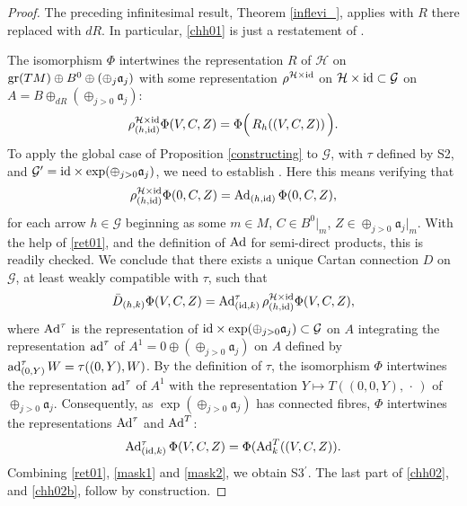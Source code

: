 \documentclass[leqno,12pt]{amsart} %
\begin{document}
\begin{proof}
  The preceding infinitesimal result, Theorem \ref{inflevi_}, applies with $R$ there
  replaced with $dR$. In particular, \eqref{chh01} is just a restatement of
  .

  The isomorphism $\Phi$ intertwines the representation $R$ of ${\mathcal H} $ on
  $\operatorname{\operatorname{gr}}(TM) \oplus B^0 \oplus (\oplus_j {\mathfrak a}_j)$ with some representation
  $\rho^{{\mathcal H} \times \mathrm{id}}$ on
  ${\mathcal H} \times \mathrm{id} \subset {\mathcal G} $ on
  $A = B\oplus_{dR}(\oplus_{j>0}{\mathfrak a}_j) $:
  \begin{equation}
    \rho^{{\mathcal H} \times \mathrm{id}}_{(h,\mathrm{id})}\Phi(V, C, Z) =
      \Phi\Big(\,R_h((V, C, Z))\,\Big).\label{ret01}
  \end{equation}
  To apply the global case of Proposition \ref{constructing} to ${\mathcal G}$, with
  $\tau $ defined by S2, and
  ${\mathcal G}'=\mathrm{id} \times \exp(\oplus_{j>0} {\mathfrak a}_j)$, we
  need to establish . Here this means verifying that
  \begin{equation*}
    \rho^{{\mathcal H} \times \mathrm{id}}_{(h,\mathrm{id})}\Phi(0, C, Z) =
    \operatorname{Ad}_{(h,\mathrm{id})}\Phi(0, C, Z),
  \end{equation*}
  for each arrow $h \in {\mathcal G}$ beginning as some $m \in M$, $C \in B^0|_m$,
  $Z \in \oplus_{j>0}{\mathfrak a}_j|_m$. With the help of \eqref{ret01}, and the
  definition of $\operatorname{Ad}$ for semi-direct products, this is readily checked. We conclude
  that there exists a unique Cartan connection $D$ on ${\mathcal G} $, at least weakly
  compatible with $\tau$, such that
  \begin{equation}
    \label{mask1}
    \bar D_{(h,k)}\Phi(V, C, Z) =
       \operatorname{Ad}^\tau_{(\mathrm{id},k)}\rho^{{\mathcal H}\times \mathrm{id}}_{(h,\mathrm{id})}\Phi(V, C, Z),
  \end{equation}
  where $\operatorname{Ad}^\tau$ is the representation of
  $\mathrm{id} \times \exp(\oplus_{j>0}{\mathfrak a}_j) \subset {\mathcal G} $ on $A$
  integrating the representation $\operatorname{ad}^\tau$ of
  $A^1=0\oplus (\oplus_{j>0}{\mathfrak a}_j)$ on $A$ defined by
  $\operatorname{ad}^\tau_{(0,Y)}W = \tau((0,Y), W)$. By the definition of $\tau $, the isomorphism
  $\Phi $ intertwines the representation $\operatorname{ad}^\tau$ of $A^1$ with the representation
  $Y \mapsto T((0,0,Y),\,\cdot\,)$ of $\oplus_{j>0}{\mathfrak a}_j$. Consequently, as
  $\exp(\oplus_{j>0}{\mathfrak a}_j)$ has connected fibres, $\Phi $ intertwines the
  representations $\operatorname{Ad}^\tau$ and $\operatorname{Ad}^T$:
  \begin{equation}
    \label{mask2}
    \operatorname{Ad}^\tau_{(\mathrm{id}, k)}\Phi(V, C, Z) = \Phi(\operatorname{Ad}^T_k((V, C, Z)).
  \end{equation}
  Combining \eqref{ret01}, \eqref{mask1} and \eqref{mask2}, we obtain S3${}^\prime$. The
  last part of \eqref{chh02}, and \eqref{chh02b}, follow by construction.


\end{proof}
\end{document}
